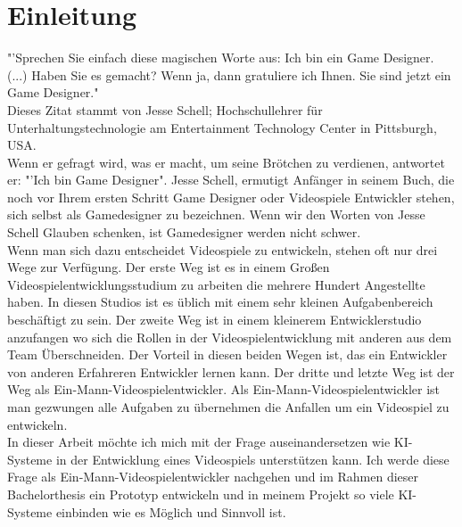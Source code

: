 \chapter{Einleitung}

"'Sprechen Sie einfach diese magischen Worte aus: Ich bin ein Game Designer. (...) Haben Sie es gemacht? Wenn ja, dann gratuliere ich Ihnen. Sie sind jetzt ein Game Designer."\cite[S. 5-6]{schell2020}
\\
Dieses Zitat stammt von Jesse Schell; Hochschullehrer für Unterhaltungstechnologie am Entertainment Technology Center in Pittsburgh, USA.
\\
Wenn er gefragt wird, was er macht, um seine Brötchen zu verdienen, antwortet er: "'Ich bin Game Designer". Jesse Schell, ermutigt Anfänger in seinem Buch, die noch vor Ihrem ersten Schritt Game Designer oder Videospiele Entwickler stehen, sich selbst als Gamedesigner zu bezeichnen. Wenn wir den Worten von Jesse Schell Glauben schenken, ist Gamedesigner werden nicht schwer.
\\
Wenn man sich dazu entscheidet Videospiele zu entwickeln, stehen oft nur drei Wege zur Verfügung. Der erste Weg ist es in einem Großen Videospielentwicklungsstudium zu arbeiten die mehrere Hundert Angestellte haben. In diesen Studios ist es üblich mit einem sehr kleinen Aufgabenbereich beschäftigt zu sein. Der zweite Weg ist in einem kleinerem Entwicklerstudio anzufangen wo sich die Rollen in der Videospielentwicklung mit anderen aus dem Team Überschneiden. Der Vorteil in diesen beiden Wegen ist, das ein Entwickler von anderen Erfahreren Entwickler lernen kann. Der dritte und letzte Weg ist der Weg als Ein-Mann-Videospielentwickler. Als Ein-Mann-Videospielentwickler ist man gezwungen alle Aufgaben zu übernehmen die Anfallen um ein Videospiel zu entwickeln.
\\
In dieser Arbeit möchte ich mich mit der Frage auseinandersetzen wie KI-Systeme in der Entwicklung eines Videospiels unterstützen kann. Ich werde diese Frage als Ein-Mann-Videospielentwickler nachgehen und im Rahmen dieser Bachelorthesis ein Prototyp entwickeln und in meinem Projekt so viele KI-Systeme einbinden wie es Möglich und Sinnvoll ist.

 
